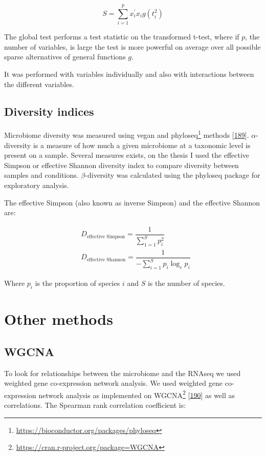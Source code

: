 \documentclass[
  a4paper,
]{book}
\DeclareRobustCommand{\href}[2]{#2\footnote{\url{#1}}}
\begin{document}
\[
S = \sum_{i=1}^p x_i^{'} x_i g(t_i^2)
\]

The global test performs a test statistic on the transformed t-test, where if \(p\), the number of variables, is large the test is more powerful on average over all possible sparse alternatives of general functions \(g\).

It was performed with variables individually and also with interactions between the different variables.

\hypertarget{diversity-indices}{%
\subsection{Diversity indices}\label{diversity-indices}}

Microbiome diversity was measured using vegan and \href{https://bioconductor.org/packages/phyloseq}{phyloseq} methods {[}\protect\hyperlink{ref-oksanen2020}{189}{]}.
\(\alpha\)-diversity is a measure of how much a given microbiome at a taxonomic level is present on a sample.
Several measures exists, on the thesis I used the effective Simpson or effective Shannon diversity index to compare diversity between samples and conditions.
\(\beta\)-diversity was calculated using the phyloseq package for exploratory analysis.

The effective Simpson (also known as inverse Simpson) and the effective Shannon are:

\[
\begin{aligned}
& D_{\text{effective Simpson}} = \dfrac{1}{\sum_{1=1}^Sp_i^2} \\
& D_{\text{effective Shannon}} = \dfrac{1}{-\sum_{i =1}^S p_i \log_e{p_i}}
\end{aligned}
\]

Where \(p_i\) is the proportion of species \(i\) and \(S\) is the number of species.

\hypertarget{other-methods}{%
\section{Other methods}\label{other-methods}}

\hypertarget{wgcna}{%
\subsection{WGCNA}\label{wgcna}}

To look for relationships between the microbiome and the RNAseq we used weighted gene co-expression network analysis.
We used weighted gene co-expression network analysis as implemented on \href{https://cran.r-project.org/package=WGCNA}{WGCNA} {[}\protect\hyperlink{ref-langfelder2008}{190}{]} as well as correlations.
The Spearman rank correlation coefficient is:
\end{document}

